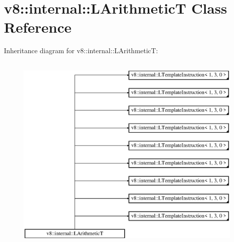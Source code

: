 \hypertarget{classv8_1_1internal_1_1_l_arithmetic_t}{}\section{v8\+:\+:internal\+:\+:L\+ArithmeticT Class Reference}
\label{classv8_1_1internal_1_1_l_arithmetic_t}
Inheritance diagram for v8\+:\+:internal\+:\+:L\+ArithmeticT\+:\begin{figure}[H]
\begin{center}
\leavevmode
\includegraphics[height=10.000000cm]{classv8_1_1internal_1_1_l_arithmetic_t}
\end{center}
\end{figure}
